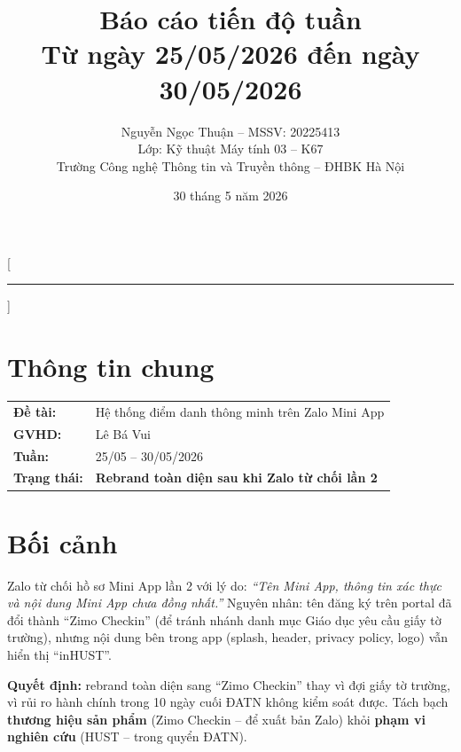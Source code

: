 \documentclass{article}
\title{Báo cáo tiến độ tuần\\[0.3em] \large Từ ngày 25/05/2026 đến ngày 30/05/2026}
\author{Nguyễn Ngọc Thuận -- MSSV: 20225413\\[0.2em] \normalsize Lớp: Kỹ thuật Máy tính 03 -- K67\\[0.1em] \normalsize Trường Công nghệ Thông tin và Truyền thông -- ĐHBK Hà Nội}
\date{30 tháng 5 năm 2026}
\begin{document}
\maketitle


\pagestyle{fancy}
\fancyhf{}
\fancyfoot[C]{\small\thepage}
\renewcommand{\headrulewidth}{0.4pt}

[\vspace{-0.3em}\textcolor{hustred}{\rule{\textwidth}{0.8pt}}]

\section{Thông tin chung}

\begin{tabularx}{\textwidth}{@{}l X@{}}
\textbf{Đề tài:} & Hệ thống điểm danh thông minh trên Zalo Mini App \\
\textbf{GVHD:} & Lê Bá Vui \\
\textbf{Tuần:} & 25/05 -- 30/05/2026 \\
\textbf{Trạng thái:} & \textcolor{statusamber}{\textbf{Rebrand toàn diện sau khi Zalo từ chối lần 2}} \\
\end{tabularx}

\section{Bối cảnh}

Zalo từ chối hồ sơ Mini App lần 2 với lý do: \textit{``Tên Mini App, thông tin xác thực và nội dung Mini App chưa đồng nhất.''} Nguyên nhân: tên đăng ký trên portal đã đổi thành ``Zimo Checkin'' (để tránh nhánh danh mục Giáo dục yêu cầu giấy tờ trường), nhưng nội dung bên trong app (splash, header, privacy policy, logo) vẫn hiển thị ``inHUST''.

\textbf{Quyết định:} rebrand toàn diện sang ``Zimo Checkin'' thay vì đợi giấy tờ trường, vì rủi ro hành chính trong 10 ngày cuối ĐATN không kiểm soát được. Tách bạch \textbf{thương hiệu sản phẩm} (Zimo Checkin -- để xuất bản Zalo) khỏi \textbf{phạm vi nghiên cứu} (HUST -- trong quyển ĐATN).
\end{document}
